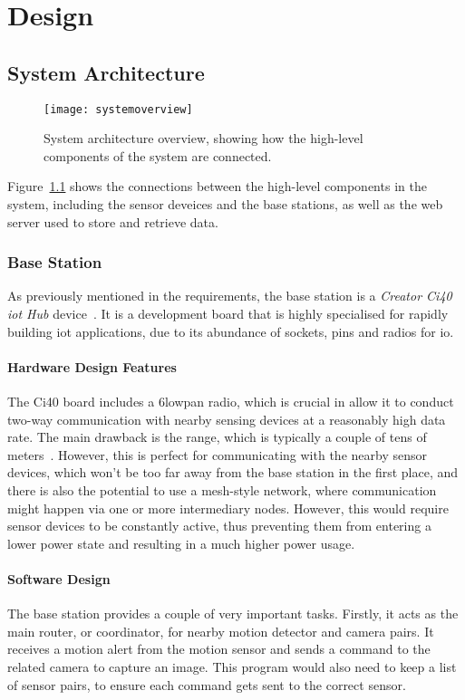 \chapter{Design}

\section{System Architecture}

\begin{figure}[h]
  \label{overviewfigure}
  \centering
  \texttt{[image: systemoverview]}
  \caption{System architecture overview, showing how the high-level components of the system are connected.}
\end{figure}

Figure~\ref{overviewfigure} shows the connections between the high-level
components in the system, including the sensor deveices and the base
stations, as well as the web server used to store and retrieve data.

\subsection{Base Station}
As previously mentioned in the requirements, the base station is a
\textit{Creator Ci40 \acrshort{iot} Hub} device~\cite{creatorci40}. It is a
development board that is highly specialised for rapidly building
\acrlong{iot} applications, due to its abundance of sockets, pins and radios
for \acrshort{io}.

\subsubsection{Hardware Design Features}

The Ci40 board includes a \gls{6lowpan} radio, which is crucial in allow it
to conduct two-way communication with nearby sensing devices at a reasonably
high data rate. The main drawback is the range, which is typically a couple
of tens of meters~\cite{culler20096lowpan}. However, this is perfect for
communicating with the nearby sensor devices, which won't be too far away
from the base station in the first place, and there is also the potential to
use a mesh-style network, where communication might happen via one or more
intermediary nodes. However, this would require sensor devices to be
constantly active, thus preventing them from entering a lower power state and
resulting in a much higher power usage.

\subsubsection{Software Design}
The base station provides a couple of very important tasks. Firstly, it acts
as the main router, or coordinator, for nearby motion detector and camera
pairs. It receives a motion alert from the motion sensor and sends a command
to the related camera to capture an image. This program would also need to
keep a list of sensor pairs, to ensure each command gets sent to the correct
sensor.

